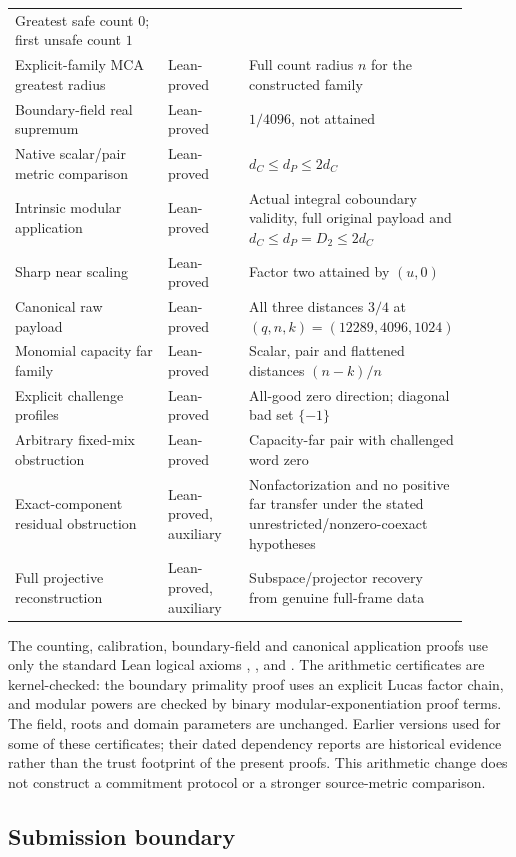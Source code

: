 \begin{longtable}{@{}>{\raggedright\arraybackslash}p{0.42\linewidth}
  >{\raggedright\arraybackslash}p{0.20\linewidth}
  >{\raggedright\arraybackslash}p{0.28\linewidth}@{}}
  Greatest safe count \(0\); first unsafe count \(1\)\\
Explicit-family MCA greatest radius & Lean-proved &
  Full count radius \(n\) for the constructed family\\
Boundary-field real supremum & Lean-proved &
  \(1/4096\), not attained\\
Native scalar/pair metric comparison & Lean-proved &
  \(d_C\le d_P\le2d_C\)\\
Intrinsic modular application & Lean-proved & Actual integral coboundary
  validity, full original payload and \(d_C\le d_P=D_2\le2d_C\)\\
Sharp near scaling & Lean-proved & Factor two attained by \((u,0)\)\\
Canonical raw payload & Lean-proved & All three distances \(3/4\) at
  \((q,n,k)=(12289,4096,1024)\)\\
Monomial capacity far family & Lean-proved &
  Scalar, pair and flattened distances \((n-k)/n\)\\
Explicit challenge profiles & Lean-proved &
  All-good zero direction; diagonal bad set \(\{-1\}\)\\
Arbitrary fixed-mix obstruction & Lean-proved &
  Capacity-far pair with challenged word zero\\
Exact-component residual obstruction & Lean-proved, auxiliary &
  Nonfactorization and no positive far transfer under the stated
  unrestricted/nonzero-coexact hypotheses\\
Full projective reconstruction & Lean-proved, auxiliary &
  Subspace/projector recovery from genuine full-frame data\\
\bottomrule
\end{longtable}
\endgroup

The counting, calibration, boundary-field and canonical application proofs
use only the standard Lean logical axioms
, , and .
The arithmetic certificates are kernel-checked: the boundary primality proof
uses an explicit Lucas factor chain, and modular powers are checked by binary
modular-exponentiation proof terms. The field, roots and domain parameters
are unchanged. Earlier versions used  for some of these
certificates; their dated dependency reports are historical evidence rather
than the trust footprint of the present proofs. This arithmetic change does
not construct a commitment protocol or a stronger source-metric comparison.

\subsection{Submission boundary}

